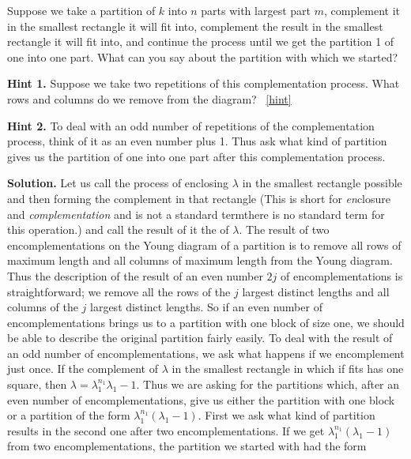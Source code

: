 \documentclass{book}
\begin{document}
\setcounter{project}{309}
\addtocounter{project}{-1}
\begin{activity}[]\label{activity-302}
\hypertarget{p-1559}{}%
Suppose we take a partition of \(k\) into \(n\) parts with largest part \(m\), complement it in the smallest rectangle it will fit into, complement the result in the smallest rectangle it will fit into, and continue the process until we get the partition 1 of one into one part.  What can you say about the partition with which we started?%
\par\smallskip%
\noindent\textbf{Hint 1.}\hypertarget{hint-196}{}\quad%
\hypertarget{p-1560}{}%
Suppose we take two repetitions of this complementation process. What rows and columns do we remove from the diagram?%
~\hfill{\tiny\hyperlink{a-309}{[hint]}\hypertarget{q-309}{}}\par\smallskip%
\noindent\textbf{Hint 2.}\hypertarget{hint-197}{}\quad%
\hypertarget{p-1561}{}%
To deal with an odd number of repetitions of the complementation process, think of it as an even number plus 1. Thus ask what kind of partition gives us the partition of one into one part after this complementation process.%
\par\smallskip%
\noindent\textbf{Solution.}\hypertarget{solution-212}{}\quad%
\hypertarget{p-1562}{}%
Let us call the process of enclosing \(\lambda\) in the smallest rectangle possible and then forming the complement in that rectangle  (This is short for \emph{en}\/closure and \emph{complementation} and is not a standard term\textemdash{}there is no standard term for this operation.) and call the result of it the  of \(\lambda\).  The result of two encomplementations on the Young diagram of a partition is to remove all rows of maximum length and all columns of maximum length from the Young diagram. Thus the description of the result of an even number \(2j\) of encomplementations is straightforward; we remove all the rows of the \(j\) largest distinct lengths and all columns of the \(j\) largest distinct lengths. So if an even number of encomplementations brings us to a partition with one block of size one, we should be able to describe the original partition fairly easily. To deal with the result of an odd number of encomplementations, we ask what happens if we encomplement just once.  If the complement of \(\lambda\) in the smallest rectangle in which if fits has one square, then \(\lambda =\lambda_1^{n_1}\lambda_1-1\). Thus we are asking for the partitions which, after an even number of encomplementations, give us either the partition with one block or a partition of the form \(\lambda_1^{n_1}(\lambda_1-1)\). First we ask what kind of partition results in the second one after two encomplementations. If we get \(\lambda_1^{n_1}(\lambda_1-1)\) from two encomplementations, the partition we started with had the form%

\end{activity}
\end{document}
